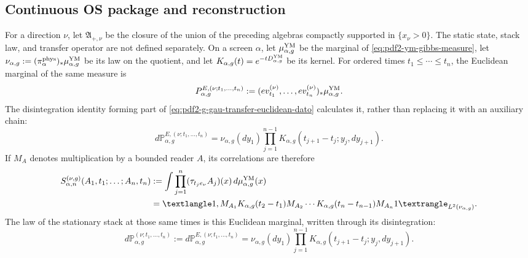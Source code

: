 \subsection{Continuous OS package and reconstruction}

For a direction $\nu$, let $\mathfrak A_{+,\nu}$ be the closure of the union of
the preceding algebras compactly supported in $\{x_\nu>0\}$. The static
state, stack law, and transfer operator are not defined
separately. On a screen $\alpha$, let
$\widehat\mu_{\alpha,g}^{\rm YM}$ be the marginal of
\eqref{eq:pdf2-ym-gibbs-measure}, let
$\nu_{\alpha,g}:=(\pi_\alpha^{\rm phys})_*
\widehat\mu_{\alpha,g}^{\rm YM}$ be its law on the quotient, and let
$K_{\alpha,g}(t)=e^{-tD_{\alpha,g}^{\rm YM}}$ be its kernel.
For ordered times $t_1\le\cdots\le t_n$, the Euclidean marginal of the
same measure is
\begin{equation}\label{eq:pdf2-ym-owner-euclidean-time-marginal}
 \mathbb P_{\alpha,g}^{E,(\nu;t_1,\ldots,t_n)}
 :=(\operatorname{ev}_{t_1}^{(\nu)},\ldots,
    \operatorname{ev}_{t_n}^{(\nu)})_*
    \widehat\mu_{\alpha,g}^{\rm YM}.
\end{equation}
The disintegration identity forming part of
\eqref{eq:pdf2-g-gau-transfer-euclidean-dato} calculates it, rather than replacing it with
an auxiliary chain:
\begin{equation}\label{eq:pdf2-ym-owner-euclidean-markov-identification}
 d\mathbb P_{\alpha,g}^{E,(\nu;t_1,\ldots,t_n)}
 =\nu_{\alpha,g}(dy_1)
   \prod_{j=1}^{n-1}K_{\alpha,g}
      (t_{j+1}-t_j;y_j,dy_{j+1}).
\end{equation}
If $M_A$ denotes multiplication by a bounded reader $A$, its correlations
are therefore
\begin{equation}\label{eq:pdf2-ym-owner-schwinger-transfer}
 \begin{aligned}
 S_{\alpha,n}^{(\nu,g)}(A_1,t_1;\ldots;A_n,t_n)
 &:=\int\prod_{j=1}^n(\tau_{t_je_\nu}A_j)(x)\,
       d\widehat\mu_{\alpha,g}^{\rm YM}(x)\\
 &=\langle\mathbf1,
 M_{A_1}K_{\alpha,g}(t_2-t_1)M_{A_2}\cdots
 K_{\alpha,g}(t_n-t_{n-1})M_{A_n}\mathbf1
 \rangle_{L^2(\nu_{\alpha,g})}.
 \end{aligned}
\end{equation}
The law of the stationary stack at those same times is this Euclidean
marginal, written through its disintegration:
\begin{equation}\label{eq:pdf2-ym-owner-markov-stack-law}
 d\mathbb P_{\alpha,g}^{(\nu;t_1,\ldots,t_n)}
 :=d\mathbb P_{\alpha,g}^{E,(\nu;t_1,\ldots,t_n)}
 =\nu_{\alpha,g}(dy_1)
   \prod_{j=1}^{n-1}K_{\alpha,g}(t_{j+1}-t_j;y_j,dy_{j+1}).
\end{equation}
